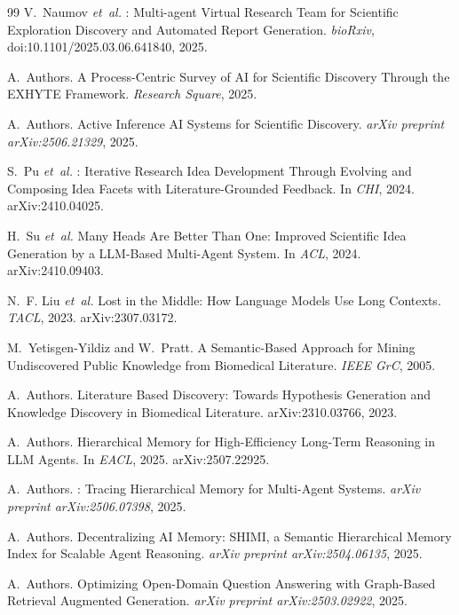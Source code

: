 \documentclass{article}
\begin{document}
\begin{thebibliography}{99}
V.~Naumov \emph{et~al.}
: Multi-agent Virtual Research Team for Scientific Exploration Discovery and Automated Report Generation.
\newblock \emph{bioRxiv}, doi:10.1101/2025.03.06.641840, 2025.

A.~Authors.
\newblock A Process-Centric Survey of {AI} for Scientific Discovery Through the {EXHYTE} Framework.
\newblock \emph{Research Square}, 2025.

A.~Authors.
\newblock Active Inference {AI} Systems for Scientific Discovery.
\newblock \emph{arXiv preprint arXiv:2506.21329}, 2025.

S.~Pu \emph{et~al.}
: Iterative Research Idea Development Through Evolving and Composing Idea Facets with Literature-Grounded Feedback.
\newblock In \emph{CHI}, 2024.
\newblock arXiv:2410.04025.

H.~Su \emph{et~al.}
\newblock Many Heads Are Better Than One: Improved Scientific Idea Generation by a {LLM-Based} Multi-Agent System.
\newblock In \emph{ACL}, 2024.
\newblock arXiv:2410.09403.

N.~F. Liu \emph{et~al.}
\newblock Lost in the Middle: How Language Models Use Long Contexts.
\newblock \emph{TACL}, 2023.
\newblock arXiv:2307.03172.

M.~Yetisgen-Yildiz and W.~Pratt.
\newblock A Semantic-Based Approach for Mining Undiscovered Public Knowledge from Biomedical Literature.
\newblock \emph{IEEE GrC}, 2005.

A.~Authors.
\newblock Literature Based Discovery: Towards Hypothesis Generation and Knowledge Discovery in Biomedical Literature.
\newblock arXiv:2310.03766, 2023.

A.~Authors.
\newblock Hierarchical Memory for High-Efficiency Long-Term Reasoning in {LLM} Agents.
\newblock In \emph{EACL}, 2025.
\newblock arXiv:2507.22925.

A.~Authors.
: Tracing Hierarchical Memory for Multi-Agent Systems.
\newblock \emph{arXiv preprint arXiv:2506.07398}, 2025.

A.~Authors.
\newblock Decentralizing {AI} Memory: {SHIMI}, a Semantic Hierarchical Memory Index for Scalable Agent Reasoning.
\newblock \emph{arXiv preprint arXiv:2504.06135}, 2025.

A.~Authors.
\newblock Optimizing Open-Domain Question Answering with Graph-Based Retrieval Augmented Generation.
\newblock \emph{arXiv preprint arXiv:2503.02922}, 2025.


\end{thebibliography}
\end{document}
